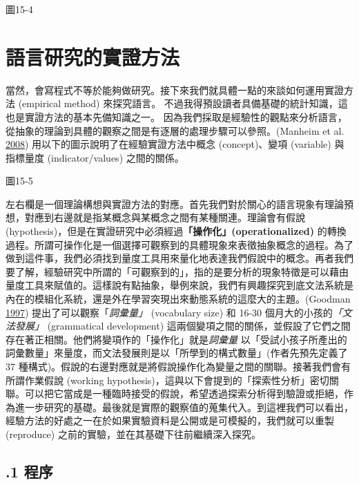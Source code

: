   
 

圖15-4

\section{語言研究的實證方法}

當然，會寫程式不等於能夠做研究。接下來我們就具體一點的來談如何運用實證方法 (empirical method) 來探究語言。 不過我得預設讀者具備基礎的統計知識，這也是實證方法的基本先備知識之一。 因為我們採取是經驗性的觀點來分析語言，從抽象的理論到具體的觀察之間是有逐層的處理步驟可以參照。(Manheim et al. \hyperlink{bookmarkidnmf14n}{2008}) 用以下的圖示說明了在經驗實證方法中概念 (concept)、變項 (variable) 與指標量度 (indicator/values) 之間的關係。

  
 

圖15-5

左右欄是一個理論構想與實證方法的對應。首先我們對於關心的語言現象有理論預想，對應到右邊就是指某概念與某概念之間有某種關連。理論會有假說 (hypothesis)，但是在實證研究中必須經過\textbf{「操作化」(operationalized)} 的轉換過程。所謂可操作化是一個選擇可觀察到的具體現象來表徵抽象概念的過程。為了做到這件事，我們必須找到量度工具用來量化地表達我們假說中的概念。再者我們要了解，經驗研究中所謂的「可觀察到的」，指的是要分析的現象特徵是可以藉由量度工具來賦值的。這樣說有點抽象，舉例來說，我們有興趣探究到底文法系統是內在的模組化系統，還是外在學習突現出來動態系統的這麼大的主題。(Goodman \hyperlink{bookmarkidvx1227}{1997}) 提出了可以觀察「\textit{詞彙量」} (vocabulary size) 和 16-30 個月大的小孩的\textit{「文法發展」} (grammatical development) 這兩個變項之間的關係，並假設了它們之間存在著正相關。他們將變項作的「操作化」就是\textit{詞彙量} 以「受試小孩子所產出的詞彙數量」來量度，而文法發展則是以「所學到的構式數量」(作者先預先定義了 37 種構式)。假說的右邊對應就是將假說操作化為變量之間的關聯。接著我們會有所謂作業假說 (working hypothesis)，這與以下會提到的「探索性分析」密切關聯。可以把它當成是一種臨時接受的假說，希望透過探索分析得到驗證或拒絕，作為進一步研究的基礎。最後就是實際的觀察值的蒐集代入。到這裡我們可以看出，經驗方法的好處之一在於如果實驗資料是公開或是可模擬的，我們就可以重製 (reproduce) 之前的實驗，並在其基礎下往前繼續深入探究。

\subsection{.1 程序}


